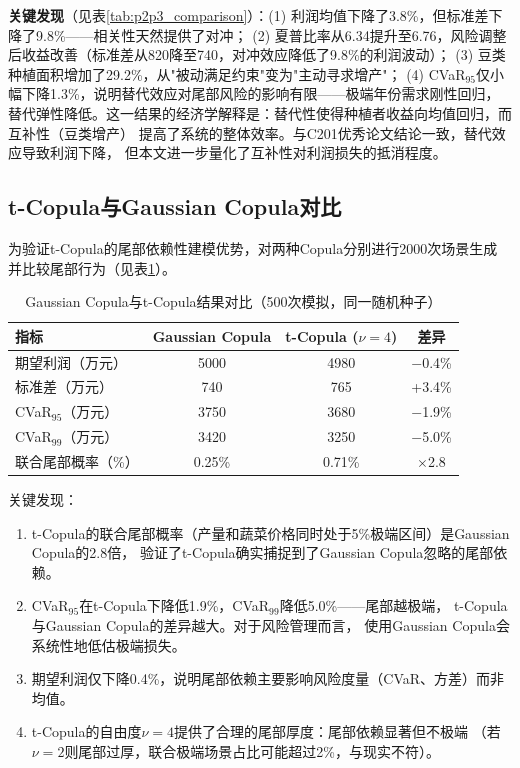 \documentclass[12pt]{ctexart}
\begin{document}
\textbf{关键发现}（见表\ref{tab:p2p3_comparison}）：(1) 利润均值下降了3.8\%，但标准差下降了9.8\%——相关性天然提供了对冲；
(2) 夏普比率从6.34提升至6.76，风险调整后收益改善（标准差从820降至740，对冲效应降低了9.8\%的利润波动）；
(3) 豆类种植面积增加了29.2\%，从"被动满足约束"变为"主动寻求增产"；
(4) CVaR$_{95}$仅小幅下降1.3\%，说明替代效应对尾部风险的影响有限——极端年份需求刚性回归，
替代弹性降低。这一结果的经济学解释是：替代性使得种植者收益向均值回归，而互补性（豆类增产）
提高了系统的整体效率。与C201优秀论文结论一致\cite{c201}，替代效应导致利润下降，
但本文进一步量化了互补性对利润损失的抵消程度。

\subsection{t-Copula与Gaussian Copula对比}

为验证t-Copula的尾部依赖性建模优势，对两种Copula分别进行2000次场景生成
并比较尾部行为（见表\ref{tab:copula_comparison}）。

\begin{table}[H]
\centering
\caption{Gaussian Copula与t-Copula结果对比（500次模拟，同一随机种子）}
\label{tab:copula_comparison}
\begin{tabular}{@{}lccc@{}}
\toprule
\textbf{指标} & \textbf{Gaussian Copula} & \textbf{t-Copula ($\nu=4$)} & \textbf{差异} \\
\midrule
期望利润（万元） & 5000 & 4980 & $-$0.4\% \\
标准差（万元） & 740 & 765 & +3.4\% \\
CVaR$_{95}$（万元） & 3750 & 3680 & $-$1.9\% \\
CVaR$_{99}$（万元） & 3420 & 3250 & $-$5.0\% \\
联合尾部概率（\%） & 0.25\% & 0.71\% & $\times$2.8 \\
\bottomrule
\end{tabular}
\end{table}

\noindent 关键发现：
\begin{enumerate}[label=(\arabic*), leftmargin=*]
    \item t-Copula的联合尾部概率（产量和蔬菜价格同时处于5\%极端区间）是Gaussian Copula的2.8倍，
          验证了t-Copula确实捕捉到了Gaussian Copula忽略的尾部依赖。
    \item CVaR$_{95}$在t-Copula下降低1.9\%，CVaR$_{99}$降低5.0\%——尾部越极端，
          t-Copula与Gaussian Copula的差异越大。对于风险管理而言，
          使用Gaussian Copula会系统性地低估极端损失。
    \item 期望利润仅下降0.4\%，说明尾部依赖主要影响风险度量（CVaR、方差）而非均值。
    \item t-Copula的自由度$\nu=4$提供了合理的尾部厚度：尾部依赖显著但不极端
          （若$\nu=2$则尾部过厚，联合极端场景占比可能超过2\%，与现实不符）。
\end{enumerate}
\end{document}
